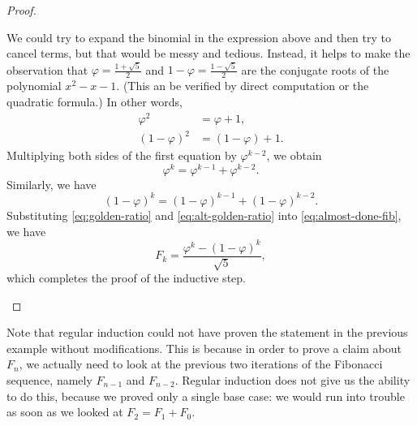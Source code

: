 \documentclass[../main.tex]{subfiles}
\begin{document}
\begin{proof}
\begin{enumerate}
        We could try to expand the binomial in the expression above and then try to cancel terms, but that would be messy and tedious. Instead, it helps to make the observation that $\varphi=\frac{1+\sqrt5}2$ and $1 - \varphi=\frac{1-\sqrt5}2$ are the conjugate roots of the polynomial $x^2 - x - 1$. (This an be verified by direct computation or the quadratic formula.) In other words,
        \begin{align*}
            \varphi^2 &= \varphi + 1,\\
            (1 - \varphi)^2 &= (1 - \varphi) + 1.
        \end{align*}
        Multiplying both sides of the first equation by $\varphi^{k - 2}$, we obtain
        \begin{equation}
            \varphi^k = \varphi^{k - 1} + \varphi^{k - 2}. \label{eq:golden-ratio}
        \end{equation}
        Similarly, we have
        \begin{equation}
            (1 - \varphi)^k = (1 - \varphi)^{k - 1} + (1 - \varphi)^{k - 2}. \label{eq:alt-golden-ratio}
        \end{equation}
        Substituting \autoref{eq:golden-ratio} and \autoref{eq:alt-golden-ratio} into \autoref{eq:almost-done-fib}, we have
        \[F_k = \frac{\varphi^k - (1 - \varphi)^k}{\sqrt{5}},\]
        which completes the proof of the inductive step.
        \qedhere
    \end{enumerate}
\end{proof}
Note that regular induction could not have proven the statement in the previous example without modifications. This is because in order to prove a claim about $F_n$, we actually need to look at the previous two iterations of the Fibonacci sequence, namely $F_{n-1}$ and $F_{n - 2}$. Regular induction does not give us the ability to do this, because we proved only a single base case: we would run into trouble as soon as we looked at $F_2 = F_1 + F_0$.
\end{document}
